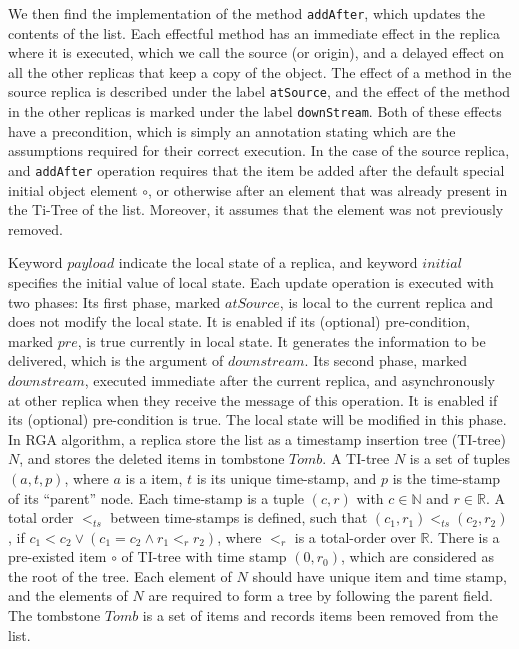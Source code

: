 We then find the implementation of the method \lstinline|addAfter|,
which updates the contents of the list.
%
Each effectful method has an immediate effect in the replica where it
is executed, which we call the source (or origin), and a delayed
effect on all the other replicas that keep a copy of the object.
%
The effect of a method in the source replica is described under the
label \lstinline|atSource|, and the effect of the method in the other
replicas is marked under the label \lstinline|downStream|.
%
Both of these effects have a precondition, which is simply an
annotation stating which are the assumptions required for their
correct execution.
%
In the case of the source replica, and \lstinline|addAfter| operation
requires that the item be added after the default special initial
object element $\circ$, or otherwise after an element that was
already present in the Ti-Tree of the list.
%
Moreover, it assumes that the element was not previously removed.



Keyword $\mathit{payload}$ indicate the local state of a replica, and
keyword $\mathit{initial}$ specifies the initial value of local state.
Each update operation is executed with two phases: Its first phase, marked $\mathit{atSource}$, is local to the current replica and does not modify the local state. It is enabled if its (optional) pre-condition, marked $\mathit{pre}$, is true currently in local state. It generates the information to be delivered, which is the argument of $\mathit{downstream}$. Its second phase, marked $\mathit{downstream}$, executed immediate after the current replica, and asynchronously at other replica when they receive the message of this operation. It is enabled if its (optional) pre-condition is true. The local state will be modified in this phase.
In RGA algorithm, a replica store the list as a timestamp insertion tree (TI-tree) $N$, and stores the deleted items in tombstone $\mathit{Tomb}$. A TI-tree $N$ is a set of tuples $(a,t,p)$, where $a$ is a item, $t$ is its unique time-stamp, and $p$ is the time-stamp of its ``parent'' node. Each time-stamp is a tuple $(c,r)$ with $c \in \mathbb{N}$ and $r \in \mathbb{R}$. A total order $<_{\mathit{ts}}$ between time-stamps is defined, such that $(c_1,r_1) <_{\mathit{ts}} (c_2,r_2)$, if $c_1 < c_2 \vee (c_1 = c_2 \wedge r_1 <_r r_2)$, where $<_r$ is a total-order over $\mathbb{R}$. There is a pre-existed item $\circ$ of TI-tree with time stamp $(0,r_0)$, which are considered as the root of the tree. Each element of $N$ should have unique item and time stamp, and the elements of $N$ are required to form a tree by following the parent field. The tombstone $\mathit{Tomb}$ is a set of items and records items been removed from the list.


